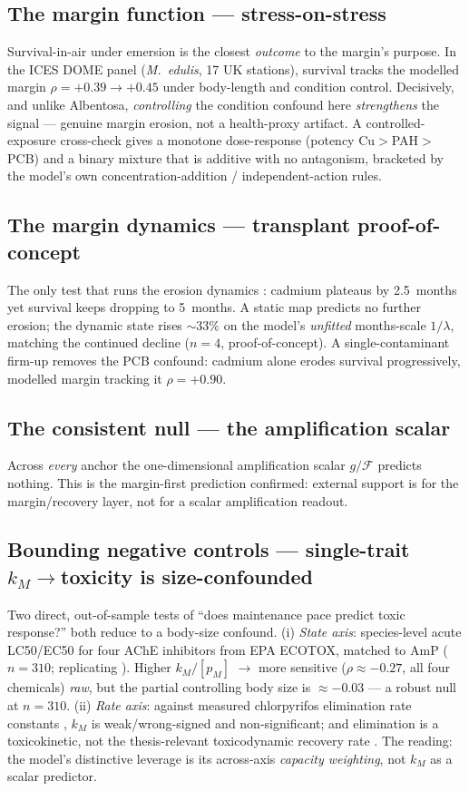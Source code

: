 \subsection{The margin function --- stress-on-stress}
Survival-in-air under emersion is the closest \emph{outcome} to the margin's purpose. In the ICES DOME
panel (\emph{M.\ edulis}, 17 UK stations), survival tracks the modelled margin
$\rho={+}0.39\to{+}0.45$ under body-length and condition control. Decisively, and unlike Albentosa,
\emph{controlling} the condition confound here \emph{strengthens} the signal --- genuine margin
erosion, not a health-proxy artifact. A controlled-exposure cross-check \citep{viarengo1995sos} gives a
monotone dose-response (potency Cu$>$PAH$>$PCB) and a binary mixture that is additive with no
antagonism, bracketed by the model's own concentration-addition / independent-action rules.

\subsection{The margin dynamics --- transplant proof-of-concept}
The only test that runs the erosion dynamics \citep{veldhuizen1991transplant}: cadmium plateaus by
2.5~months yet survival keeps dropping to 5~months. A static map predicts no further erosion; the
dynamic state rises ${\sim}33\%$ on the model's \emph{unfitted} months-scale $1/\lambda$, matching the
continued decline ($n{=}4$, proof-of-concept). A single-contaminant firm-up \citep{veldhuizen1991single}
removes the PCB confound: cadmium alone erodes survival progressively, modelled margin tracking it
$\rho={+}0.90$.

\subsection{The consistent null --- the amplification scalar}
Across \emph{every} anchor the one-dimensional amplification scalar $g/\mathcal{F}$ predicts nothing.
This is the margin-first prediction confirmed: external support is for the margin/recovery layer, not
for a scalar amplification readout.

\subsection{Bounding negative controls --- single-trait $k_M\to$toxicity is size-confounded}
Two direct, out-of-sample tests of ``does maintenance pace predict toxic response?'' both reduce to a
body-size confound. (i) \emph{State axis}: species-level acute LC50/EC50 for four AChE inhibitors from
EPA ECOTOX, matched to AmP ($n{=}310$; replicating \citealp{baas2015metabolic}). Higher $k_M/[p_M]$
$\to$ more sensitive ($\rho\approx-0.27$, all four chemicals) \emph{raw}, but the partial controlling
body size is $\approx-0.03$ --- a robust null at $n{=}310$. (ii) \emph{Rate axis}: against measured
chlorpyrifos elimination rate constants \citep{rubach2010tk}, $k_M$ is weak/wrong-signed and
non-significant; and elimination is a toxicokinetic, not the thesis-relevant toxicodynamic recovery
rate \citep{nyman2012guts}. The reading: the model's distinctive leverage is its across-axis
\emph{capacity weighting}, not $k_M$ as a scalar predictor.

